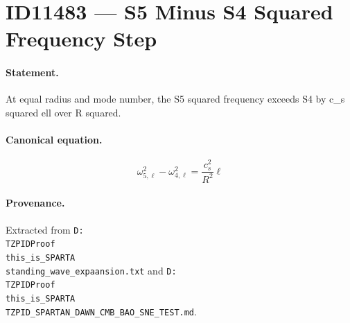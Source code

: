 \section*{ID11483 --- S5 Minus S4 Squared Frequency Step}

\paragraph{Statement.}
At equal radius and mode number, the S5 squared frequency exceeds S4 by c_s squared ell over R squared.

\paragraph{Canonical equation.}
\[
\omega_{5,\ell}^2-\omega_{4,\ell}^2=\frac{c_s^2}{R^2}\ell
\]

\paragraph{Provenance.}
Extracted from \texttt{D:\\TZPIDProof\\this\_is\_SPARTA\\standing\_wave\_expaansion.txt} and \texttt{D:\\TZPIDProof\\this\_is\_SPARTA\\TZPID\_SPARTAN\_DAWN\_CMB\_BAO\_SNE\_TEST.md}.
